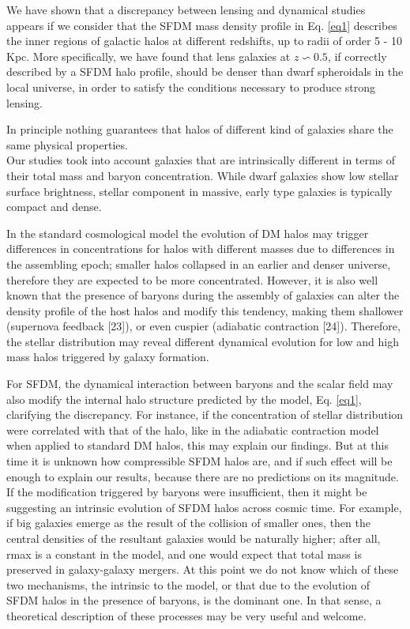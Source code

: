 \documentclass[10pt,a4paper]{article}
\begin{document}
\begin{multicols}{2}
We have shown that a discrepancy between lensing and dynamical studies appears if we consider that the SFDM mass density profile in Eq. \eqref{eq1} describes the inner regions of galactic halos at different redshifts, up to radii of order 5 - 10 Kpc. More specifically, we have found that lens galaxies at $z \backsim 0.5$, if correctly described by a SFDM halo profile, should be denser than dwarf spheroidals in the local universe, in order to satisfy the conditions necessary to produce strong lensing.\

In principle nothing guarantees that halos of different kind of galaxies share the same physical properties.\\
Our studies took into account galaxies that are intrinsically different in terms of their total mass and baryon concentration. While dwarf galaxies show low stellar surface brightness, stellar component in massive, early type galaxies is typically compact and dense.\

In the standard cosmological model the evolution of DM halos may trigger differences in concentrations for halos with different masses due to differences in the assembling epoch; smaller halos collapsed in an earlier and denser universe, therefore they are expected to be more concentrated. However, it is also well known that the presence of baryons during the assembly of galaxies can alter the density profile of the host halos and modify this tendency, making them shallower (supernova feedback [23]), or even cuspier (adiabatic contraction [24]). Therefore, the stellar distribution may reveal different dynamical evolution for low and high mass halos triggered by galaxy formation.\

For SFDM, the dynamical interaction between baryons and the scalar field may also modify the internal halo structure predicted by the model, Eq. \eqref{eq1}, clarifying the discrepancy. For instance, if the concentration of stellar distribution were correlated with that of the halo, like in the adiabatic contraction model when applied to standard DM halos, this may explain our findings. But at this time it is unknown how compressible SFDM halos are, and if such effect will be enough to explain our results, because there are no predictions on its magnitude. If the modification triggered by baryons were insufficient, then it might be suggesting an intrinsic evolution of SFDM halos across cosmic time. For example, if big galaxies emerge as the result of the collision of smaller ones, then the central densities of the resultant galaxies would be naturally higher; after all, rmax is a constant in the model, and one would expect that total mass is preserved in galaxy-galaxy mergers. At this point we do not know which of these two mechanisms, the intrinsic to the model, or that due to the evolution of SFDM halos in the presence of baryons, is the dominant one. In that sense, a theoretical description of these processes may be very useful and welcome.\


\end{multicols}
\end{document}
